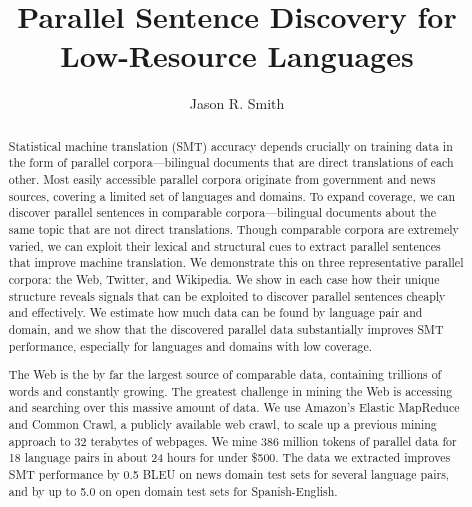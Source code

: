 \documentclass[12pt,oneside,final]{thesis}
\begin{document}
\title{Parallel Sentence Discovery for Low-Resource Languages}

\author{Jason R. Smith}
\dissertation
\doctorphilosophy
\copyrightnotice

\maketitle

\begin{abstract}
Statistical machine translation (SMT) accuracy depends crucially on training
data in the form of parallel corpora---bilingual documents that are direct
translations of each other. Most easily accessible parallel corpora originate
from government and news sources, covering a limited set of languages and
domains. To expand coverage, we can discover parallel sentences in comparable
corpora---bilingual documents about the same topic that are not direct
translations. Though comparable corpora are extremely varied, we can exploit
their lexical and structural cues to extract parallel sentences that improve machine
translation. We demonstrate this on three representative parallel corpora: the
Web, Twitter, and Wikipedia. We show in each case how their unique structure
reveals signals that can be exploited to discover parallel sentences cheaply and
effectively. We estimate how much data can be found by language pair and domain,
and we show that the discovered parallel data substantially improves SMT
performance, especially for languages and domains with low coverage.

The Web is the by far the largest source of comparable data, containing
trillions of words and constantly growing. The greatest challenge in mining the
Web is accessing and searching over this massive amount of data.
We use Amazon's Elastic MapReduce and 
Common Crawl, a publicly available web crawl, to scale up a previous mining
approach \citep{Resnik03} to 32 terabytes of webpages. 
We mine 386
million tokens of parallel data for 18 language pairs in about 24 hours for under \$500.
The data we extracted improves SMT performance by
0.5 BLEU on news domain test sets for several language pairs,
and by up to 5.0 on open domain test sets for Spanish-English.


\end{abstract}
\end{document}
